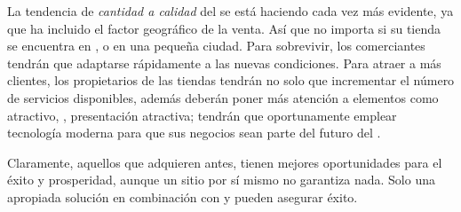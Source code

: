 			La tendencia de \textit{cantidad a calidad} del \ecommerceCOM se está haciendo cada vez más evidente, ya que \internetINT ha incluido el factor geográfico de la venta. Así que no importa si su tienda se encuentra en \newYorkNAME, \londresNAME o en una pequeña ciudad. Para sobrevivir, los comerciantes tendrán que adaptarse rápidamente a las nuevas condiciones. Para atraer a más clientes, los propietarios de las tiendas \online tendrán no solo que incrementar el número de servicios disponibles, además deberán poner más atención a elementos como \designQA atractivo, \userfriendliness, presentación atractiva; tendrán que oportunamente emplear tecnología moderna para que sus negocios sean parte del futuro del \ecommerceCOM.

			Claramente, aquellos que adquieren \estores antes, tienen mejores oportunidades  para el éxito y prosperidad, aunque un sitio \ecommerceCOM por sí mismo no garantiza nada. Solo una apropiada solución \ecommerceCOM en combinación con \emarketing y \advertising pueden asegurar éxito.

